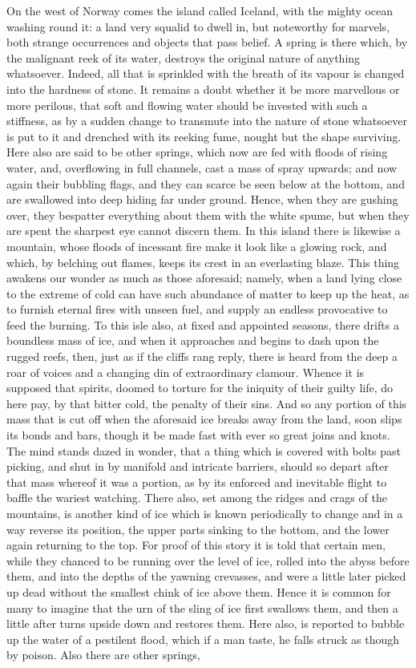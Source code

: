\documentclass[10pt,a4paper]{report}
\begin{document}
On the west of Norway comes the island called Iceland, with the mighty ocean washing round it: a land very squalid to dwell in, but noteworthy for marvels, both strange occurrences and objects that pass belief. A spring is there which, by the malignant reek of its water, destroys the original nature of anything whatsoever. Indeed, all that is sprinkled with the breath of its vapour is changed into the hardness of stone. It remains a doubt whether it be more marvellous or more perilous, that soft and flowing water should be invested with such a stiffness, as by a sudden change to transmute into the nature of stone whatsoever is put to it and drenched with its reeking fume, nought but the shape surviving. Here also are said to be other springs, which now are fed with floods of rising water, and, overflowing in full channels, cast a mass of spray upwards; and now again their bubbling flags, and they can scarce be seen below at the bottom, and are swallowed into deep hiding far under ground. Hence, when they are gushing over, they bespatter everything about them with the white spume, but when they are spent the sharpest eye cannot discern them. In this island there is likewise a mountain, whose floods of incessant fire make it look like a glowing rock, and which, by belching out flames, keeps its crest in an everlasting blaze. This thing awakens our wonder as much as those aforesaid; namely, when a land lying close to the extreme of cold can have such abundance of matter to keep up the heat, as to furnish eternal fires with unseen fuel, and supply an endless provocative to feed the burning. To this isle also, at fixed and appointed seasons, there drifts a boundless mass of ice, and when it approaches and begins to dash upon the rugged reefs, then, just as if the cliffs rang reply, there is heard from the deep a roar of voices and a changing din of extraordinary clamour. Whence it is supposed that spirits, doomed to torture for the iniquity of their guilty life, do here pay, by that bitter cold, the penalty of their sins. And so any portion of this mass that is cut off when the aforesaid ice breaks away from the land, soon slips its bonds and bars, though it be made fast with ever so great joins and knots. The mind stands dazed in wonder, that a thing which is covered with bolts past picking, and shut in by manifold and intricate barriers, should so depart after that mass whereof it was a portion, as by its enforced and inevitable flight to baffle the wariest watching. There also, set among the ridges and crags of the mountains, is another kind of ice which is known periodically to change and in a way reverse its position, the upper parts sinking to the bottom, and the lower again returning to the top. For proof of this story it is told that certain men, while they chanced to be running over the level of ice, rolled into the abyss before them, and into the depths of the yawning crevasses, and were a little later picked up dead without the smallest chink of ice above them. Hence it is common for many to imagine that the urn of the sling of ice first swallows them, and then a little after turns upside down and restores them. Here also, is reported to bubble up the water of a pestilent flood, which if a man taste, he falls struck as though by poison. Also there are other springs, 
\end{document}
